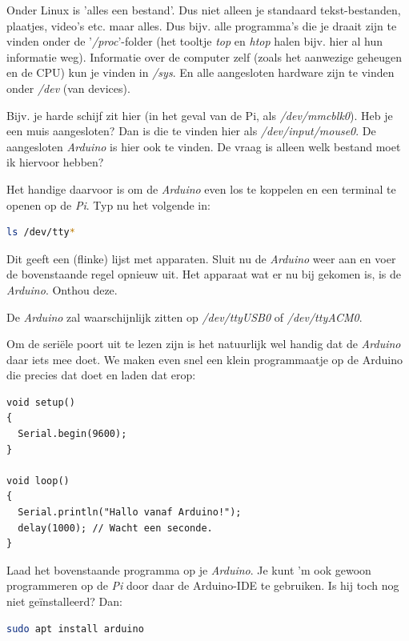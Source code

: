 Onder Linux is 'alles een bestand'. Dus niet alleen je standaard tekst-bestanden, plaatjes, video's etc. maar alles. Dus bijv. alle programma's die je draait zijn te vinden onder de '\textit{/proc}'-folder (het tooltje \textit{top} en \textit{htop} halen bijv. hier al hun informatie weg). Informatie over de computer zelf (zoals het aanwezige geheugen en de CPU) kun je vinden in \textit{/sys}. En alle aangesloten hardware zijn te vinden onder \textit{/dev} (van devices). 

Bijv. je harde schijf zit hier (in het geval van de Pi, als \textit{/dev/mmcblk0}). Heb je een muis aangesloten? Dan is die te vinden hier als \textit{/dev/input/mouse0}. De aangesloten \textit{Arduino} is hier ook te vinden. De vraag is alleen welk bestand moet ik hiervoor hebben? 

Het handige daarvoor is om de \textit{Arduino} even los te koppelen en een terminal te openen op de \textit{Pi}. Typ nu het volgende in:
\begin{lstlisting}[language=bash]
ls /dev/tty*
\end{lstlisting}
Dit geeft een (flinke) lijst met apparaten. Sluit nu de \textit{Arduino} weer aan en voer de bovenstaande regel opnieuw uit. Het apparaat wat er nu bij gekomen is, is de \textit{Arduino}. Onthou deze.

\begin{remark}
  De \textit{Arduino} zal waarschijnlijk zitten op \textit{/dev/ttyUSB0} of \textit{/dev/ttyACM0}.
\end{remark}

\newpage 

Om de seriële poort uit te lezen zijn is het natuurlijk wel handig dat de \textit{Arduino} daar iets mee doet. We maken even snel een klein programmaatje op de Arduino die precies dat doet en laden dat erop:
\begin{lstlisting}[language=Arduino]
void setup() 
{
  Serial.begin(9600);
}

void loop() 
{
  Serial.println("Hallo vanaf Arduino!");
  delay(1000); // Wacht een seconde.
}
\end{lstlisting}
\begin{exercise}
  Laad het bovenstaande programma op je \textit{Arduino}. Je kunt 'm ook gewoon programmeren op de \textit{Pi} door daar de Arduino-IDE te gebruiken. Is hij toch nog niet geïnstalleerd? Dan:
  \begin{lstlisting}[language=bash]
  sudo apt install arduino
  \end{lstlisting}
  \vspace{-5mm}
\end{exercise}

